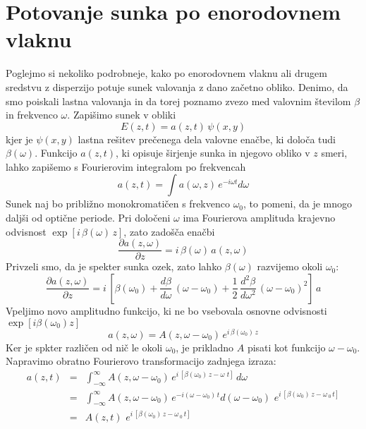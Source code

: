\section{Potovanje sunka po enorodovnem vlaknu}
Poglejmo si nekoliko podrobneje, kako po enorodovnem vlaknu ali drugem
sredstvu z disperzijo potuje sunek valovanja z dano začetno obliko.
Denimo, da smo poiskali lastna valovanja in da torej poznamo zvezo
med valovnim številom $\beta$ in frekvenco $\omega$. Zapišimo sunek
v obliki 
\begin{equation}
E\left(z,t\right)=a\left(z,t\right)\,\psi\left(x,y\right)\label{9.61}
\end{equation}
 kjer je $\psi\left(x,y\right)$ lastna rešitev prečenega dela valovne
enačbe, ki določa tudi $\beta\left(\omega\right)$. Funkcijo $a\left(z,t\right)$,
ki opisuje širjenje sunka in njegovo obliko v $z$ smeri, lahko zapišemo
s Fourierovim integralom po frekvencah 
\begin{equation}
a\left(z,t\right)=\int a(\omega,z)\, e^{-i\omega t}d\omega\label{9.62}
\end{equation}
 Sunek naj bo približno monokromatičen s frekvenco $\omega_{0}$,
to pomeni, da je mnogo daljši od optične periode. Pri določeni $\omega$
ima Fourierova amplituda krajevno odvisnost $\exp[i\,\beta\left(\omega\right)\, z]$,
zato zadošča enačbi 
\begin{equation}
\frac{\partial a\left(z,\omega\right)}{\partial z}=i\,\beta\left(\omega\right)\, a\left(z,\omega\right)\label{9.63}
\end{equation}
 Privzeli smo, da je spekter sunka ozek, zato lahko $\beta\left(\omega\right)$
razvijemo okoli $\omega_{0}$: 
\begin{equation}
\frac{\partial a\left(z,\omega\right)}{\partial z}=i\,\left[\beta\left(\omega_{0}\right)+\frac{d\beta}{d\omega}\,\left(\omega-\omega_{0}\right)+\frac{1}{2}\,\frac{d^{2}\beta}{d\omega^{2}}\,\left(\omega-\omega_{0}\right)^{2}\right]\, a\label{9.64}
\end{equation}
 Vpeljimo novo amplitudno funkcijo, ki ne bo vsebovala osnovne odvisnosti
$\exp[i\beta\left(\omega_{0}\right)z]$ 
\begin{equation}
a\left(z,\omega\right)=A\left(z,\omega-\omega_{0}\right)\, e^{i\,\beta\left(\omega_{0}\right)\, z}\label{9.65}
\end{equation}
 Ker je spkter različen od nič le okoli $\omega_{0}$, je prikladno
$A$ pisati kot funkcijo $\omega-\omega_{0}$. Napravimo obratno Fourierovo
transformacijo zadnjega izraza: 
\begin{eqnarray}
a\left(z,t\right) & = & \int_{-\infty}^{\infty}A\left(z,\omega-\omega_{0}\right)\, e^{i\,[\beta\left(\omega_{0}\right)\, z-\omega\,\, t]}\, d\omega\label{9.66}\\
 & = & \int_{-\infty}^{\infty}A\left(z,\omega-\omega_{0}\right)\, e^{-i\left(\omega-\omega_{0}\right)\, t}d\left(\omega-\omega_{0}\right)\,\, e^{i\,[\beta\left(\omega_{0}\right)\, z-\omega\,_{0}\, t]}\nonumber \\
 & = & A\left(z,t\right)\,\, e^{i\,[\beta\left(\omega_{0}\right)\, z-\omega\,_{0}\, t]}\nonumber 
\end{eqnarray}
